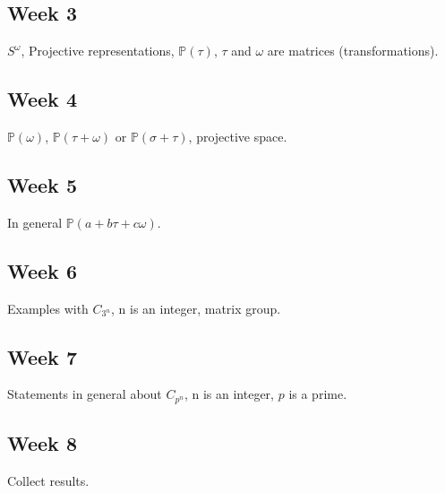 \documentclass[12pt]{article}
\begin{document}
\subsection{Week 3}
$S^{\omega}$, Projective representations, $\mathbb{P}(\tau)$, $\tau$ and $\omega$ are matrices (transformations).

\subsection{Week 4}
$\mathbb{P}(\omega)$, $\mathbb{P}(\tau + \omega)$ or $\mathbb{P}(\sigma + \tau)$, projective space.

\subsection{Week 5}
In general $\mathbb{P}(a + b\tau + c\omega)$.

\subsection{Week 6}
Examples with $C_{3^n}$, n is an integer, matrix group.

\subsection{Week 7}
Statements in general about $C_{p^n}$, n is an integer, $p$ is a prime.

\subsection{Week 8}
Collect results.



\end{document}
